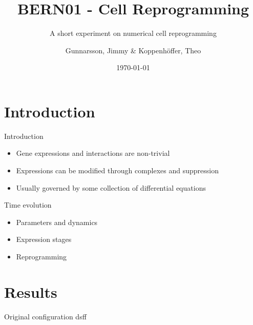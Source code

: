 \documentclass[aspectratio=169]{beamer}
\title[Cell Reprogramming]{BERN01 - Cell Reprogramming}
\author{Gunnarsson, Jimmy \& Koppenhöffer, Theo}
\subtitle{A short experiment on numerical cell reprogramming}
\date{\today}
\institute{Lund University\\Department of Mathematics}
\begin{document}
\titleframe

\section{Introduction}
\begin{frame}{Introduction}
			\begin{itemize}
				\item Gene expressions and interactions are non-trivial  
				\item Expressions can be modified through complexes and suppression 
				\item Usually governed by some collection of differential equations
			\end{itemize}
\end{frame} 
\begin{frame}{Time evolution}
    \begin{itemize}
        \item Parameters and dynamics 
        \item Expression stages  
        \item Reprogramming 
    \end{itemize}
\end{frame}
\section{Results}
\begin{frame}{Original configuration}
dsff

    
\end{frame}


%   

\end{document}
